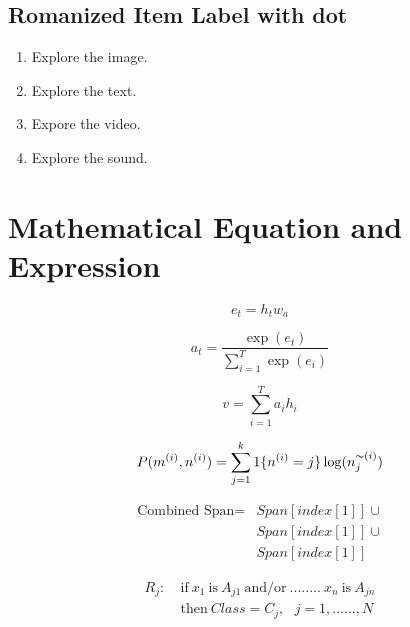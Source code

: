 \documentclass[11pt]{article}
\begin{document}
{\subsection{Romanized Item Label with dot}
\begin{enumerate}[nosep, label=\Roman*.]
\item Explore the image.
\item Explore the text.
\item Expore the video.
\item Explore the sound.
\end{enumerate}



\section{Mathematical Equation and Expression}
\label{ref:equation}
\begin{equation}
e_{t}=h_{t}w_{a}
\label{eqn:sampleEqn}
\end{equation}

\begin{equation*}
a_{t}  = \frac{\exp(e_{t})}{\sum^{T}_{i=1}\exp(e_{i})}
\end{equation*}

\begin{equation*}
v={\sum^{T}_{i=1} a_{i}h_{i}}
\end{equation*}

\begin{equation*}
P(m^{(i)},n^{(i)}) = \sum^{k}_{j=1} 1\{n^{(i)}=j\} \log(n_{j}^{\thicksim(i)})
\end{equation*}


\begin{equation*}
\begin{split}
\mbox{Combined Span} = &Span[index[1]] \cup \\  
                       &Span[index[1]] \cup \\
                       &Span[index[1]]
\end{split}
\end{equation*}


\begin{equation*}
\begin{split}
R_j: & \ \mbox{if}\ x_1\ \mbox{is}\ A_{j1}\ \mbox{and/or}\ ........\ x_n\ \mbox{is}\ A_{jn}\\
	 & \ \mbox{then}\ Class=C_j, \ \ \ j=1,......,N
\end{split}
\end{equation*}

}
\end{document}

